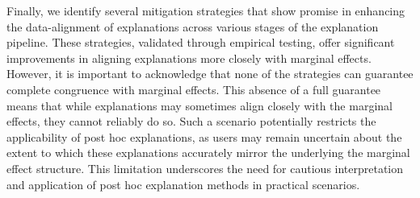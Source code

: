 \documentclass[mnsc,blindrev]{informs3}
\begin{document}
        
         Finally, we identify several mitigation strategies that show promise in enhancing the data-alignment of explanations across various stages of the explanation pipeline. These strategies, validated through empirical testing, offer significant improvements in aligning explanations more closely with marginal effects. However, it is important to acknowledge that none of the strategies can guarantee complete congruence with marginal effects. This absence of a full guarantee means that while explanations may sometimes align closely with the marginal effects, they cannot reliably do so. Such a scenario potentially restricts the applicability of post hoc explanations, as users may remain uncertain about the extent to which these explanations accurately mirror the underlying the marginal effect structure. This limitation underscores the need for cautious interpretation and application of post hoc explanation methods in practical scenarios.
        
        

            



        
\end{document}
